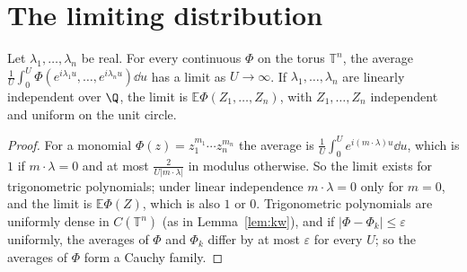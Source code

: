 \section{The limiting distribution}

\begin{lemma}\label{lem:kwreal}
Let $\lambda_1,\dots,\lambda_n$ be real. For every continuous $\Phi$ on the torus $\mathbb T^n$, the average $\frac1U\int_0^U\Phi(e^{i\lambda_1u},\dots,e^{i\lambda_nu})\dd u$ has a limit as $U\to\infty$. If $\lambda_1,\dots,\lambda_n$ are linearly independent over $\Q$, the limit is $\mathbb E\Phi(Z_1,\dots,Z_n)$, with $Z_1,\dots,Z_n$ independent and uniform on the unit circle.
\end{lemma}
\begin{proof}
For a monomial $\Phi(z)=z_1^{m_1}\cdots z_n^{m_n}$ the average is $\frac1U\int_0^Ue^{i(m\cdot\lambda)u}\dd u$, which is $1$ if $m\cdot\lambda=0$ and at most $\frac2{U|m\cdot\lambda|}$ in modulus otherwise. So the limit exists for trigonometric polynomials; under linear independence $m\cdot\lambda=0$ only for $m=0$, and the limit is $\mathbb E\Phi(Z)$, which is also $1$ or $0$. Trigonometric polynomials are uniformly dense in $C(\mathbb T^n)$ (as in Lemma~\ref{lem:kw}), and if $|\Phi-\Phi_k|\le\varepsilon$ uniformly, the averages of $\Phi$ and $\Phi_k$ differ by at most $\varepsilon$ for every $U$; so the averages of $\Phi$ form a Cauchy family.
\end{proof}

